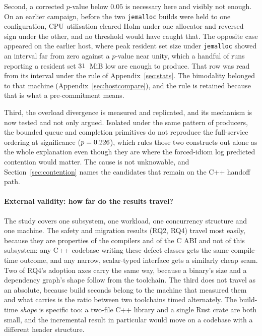 \documentclass[english,oneside,a4paper,censored,csm,software-track-2020]{HYthesisML}
\begin{document}
\begin{appendices}
Second, a corrected $p$-value below $0.05$ is necessary here and visibly not enough. On an earlier
campaign, before the two \texttt{jemalloc} builds were held to one configuration, CPU utilisation
cleared Holm under one allocator and reversed sign under the other, and no threshold would have
caught that. The opposite case appeared on the earlier host, where peak resident set size under
\texttt{jemalloc} showed an interval far from zero against a $p$-value near unity, which a handful
of runs reporting a resident set $31$~MiB low are enough to produce. That row
was read from its interval under the rule of Appendix~\ref{sec:stats}. The bimodality belonged to
that machine (Appendix~\ref{sec:hostcompare}), and the rule is retained because that is what a
pre-commitment means.

Third, the overload divergence is measured and replicated, and its mechanism is now tested and not
only argued. Isolated under the same pattern of \ContentionProducers{} producers, the bounded
queue and completion primitives do not reproduce the full-service ordering at significance
($p = 0.226$), which rules those two constructs out alone as the whole explanation even
though they are where the forced-idiom log predicted contention would matter. The cause is not
unknowable, and Section~\ref{sec:contention} names the candidates that remain on the C++ handoff
path.

\paragraph{External validity: how far do the results travel?}
The study covers one subsystem, one workload, one concurrency structure and one machine. The
safety and migration results (RQ2, RQ4) travel most easily, because they are properties of the
compilers and of the C ABI and not of this subsystem: any C++ codebase writing these defect
classes gets the same compile-time outcome, and any narrow, scalar-typed interface gets a
similarly cheap seam. Two of RQ4's adoption axes carry the same way, because a binary's size and a
dependency graph's shape follow from the toolchain. The third does not travel as an absolute,
because build seconds belong to the machine that measured them and what carries is the ratio
between two toolchains timed alternately. The build-time \emph{shape} is specific too: a two-file
C++ library and a single Rust crate are both small, and the incremental result in particular would
move on a codebase with a different header structure.


\end{appendices}
\end{document}
